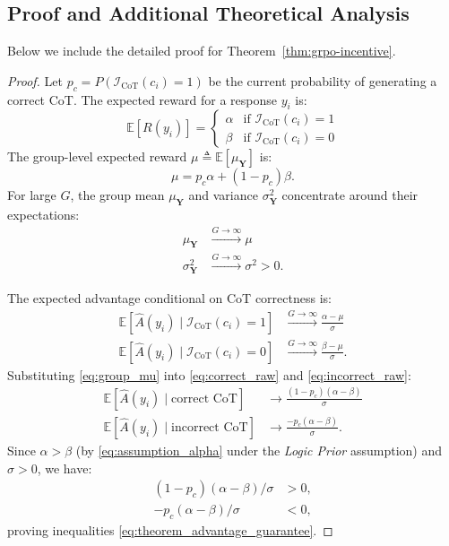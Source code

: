 \subsection{Proof and Additional Theoretical Analysis}
\label{supp_sec:theorem_proof}

Below we include the detailed proof for Theorem~\ref{thm:grpo-incentive}.

\begin{proof}
Let $p_c = P(\mathcal{I}_{\text{CoT}}(c_i)=1)$ be the current probability of generating a correct CoT. The expected reward for a response $y_i$ is:
\begin{equation}
\mathbb{E}[R(y_i)] = 
\begin{cases} 
\alpha & \text{if } \mathcal{I}_{\text{CoT}}(c_i)=1 \\
\beta & \text{if } \mathcal{I}_{\text{CoT}}(c_i)=0 
\end{cases}
\end{equation}
The group-level expected reward $\mu \triangleq \mathbb{E}[\mu_{\mathbf{Y}}]$ is:
\begin{equation}
\mu = p_c \alpha + (1 - p_c)\beta. \label{eq:group_mu}
\end{equation}
For large $G$, the group mean $\mu_{\mathbf{Y}}$ and variance $\sigma_{\mathbf{Y}}^2$ concentrate around their expectations:
\begin{align}
\mu_{\mathbf{Y}} &\xrightarrow{G \to \infty} \mu
\label{eq:mu_converge}
\\
\sigma_{\mathbf{Y}}^2 &\xrightarrow{G \to \infty} \sigma^2 > 0. \label{eq:sigma_converge}
\end{align}

The expected advantage conditional on CoT correctness is:
\begin{align}
\mathbb{E}[\hat{A}(y_i) \mid \mathcal{I}_{\text{CoT}}(c_i)=1] &
\xrightarrow{G \to \infty}
\frac{\alpha - \mu}{\sigma} \label{eq:correct_raw} \\
\mathbb{E}[\hat{A}(y_i) \mid \mathcal{I}_{\text{CoT}}(c_i)=0] &
\xrightarrow{G \to \infty}
\frac{\beta - \mu}{\sigma}. \label{eq:incorrect_raw}
\end{align}
Substituting \eqref{eq:group_mu} into \eqref{eq:correct_raw} and \eqref{eq:incorrect_raw}:
\begin{align}
\mathbb{E}[\hat{A}(y_i) \mid \text{correct CoT}] &
\rightarrow
\frac{(1 - p_c)(\alpha - \beta)}{\sigma} \label{eq:correct_final} \\
\mathbb{E}[\hat{A}(y_i) \mid \text{incorrect CoT}] &
\rightarrow
\frac{-p_c(\alpha - \beta)}{\sigma}. \label{eq:incorrect_final}
\end{align}
Since $\alpha > \beta$ (by \eqref{eq:assumption_alpha} under the \emph{Logic Prior} assumption) and $\sigma > 0$, we have:
\begin{align*}
(1 - p_c)(\alpha - \beta)/\sigma &> 0, \\
-p_c(\alpha - \beta)/\sigma &< 0,
\end{align*}
proving inequalities \eqref{eq:theorem_advantage_guarantee}.


\end{proof}
